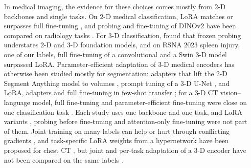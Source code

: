 In medical imaging, the evidence for these choices comes mostly from 2-D backbones and single tasks. On 2-D medical classification, LoRA matches or surpasses full fine-tuning \citep{dutt2024peft,zhu2024melo}, and probing and fine-tuning of DINOv2 \citep{oquab2023dinov2} have been compared on radiology tasks \citep{baharoon2023dinov2med}. For 3-D classification, \citet{liu2025anymc3d} found that frozen probing understates 2-D and 3-D foundation models, and on RSNA 2023 spleen injury, one of our labels, full fine-tuning of a convolutional and a Swin 3-D model surpassed LoRA. Parameter-efficient adaptation of 3-D medical encoders has otherwise been studied mostly for segmentation: adapters that lift the 2-D Segment Anything model \citep{kirillov2023sam} to volumes \citep{gong20243dsamadapter,chen2024masam,wu2025medsa}, prompt tuning of a 3-D U-Net \citep{fischer2024prompttuning}, and LoRA, adapters and full fine-tuning in few-shot transfer \citep{silvarodriguez2025fseft,ly2026seapeft}; for a 3-D CT vision--language model, full fine-tuning and parameter-efficient fine-tuning were close on one classification task \citep{kartika2026hcc}. Each study uses one backbone and one task, and LoRA variants \citep{liu2024dora,kalajdzievski2023rslora}, probing before fine-tuning \citep{kumar2022lpft} and attention-only fine-tuning \citep{touvron2022three} were not part of them. Joint training on many labels can help \citep{kim2023ctan} or hurt through conflicting gradients \citep{yu2020pcgrad,zhao2023mtlreview}, and task-specific LoRA weights from a hypernetwork have been proposed for chest CT \citep{liu2026hyperct}, but joint and per-task adaptation of a 3-D encoder have not been compared on the same labels \citep{veenboer2025tapct,liu2025anymc3d}.

